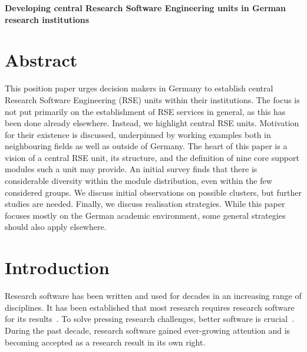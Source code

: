 \documentclass[10pt,letterpaper]{article}
\begin{document}
\vspace*{0.2in}

\begin{flushleft}
{\Large
\textbf{Developing central Research Software Engineering units in German research institutions} %
}
\newline
\\


\end{flushleft}

\section*{Abstract}
This position paper urges decision makers in Germany to establish central Research Software Engineering (RSE) units within their institutions.
The focus is not put primarily on the establishment of RSE services in general, as this has been done already elsewhere.
Instead, we highlight central RSE units.
Motivation for their existence is discussed, underpinned by working examples both in neighbouring fields as well as outside of Germany.
The heart of this paper is a vision of a central RSE unit, its structure, and the definition of nine core support modules such a unit may provide.
An initial survey finds that there is considerable diversity within the module distribution, even within the few considered groups.
We discuss initial observations on possible clusters, but further studies are needed.
Finally, we discuss realisation strategies.
While this paper focuses mostly on the German academic environment, some general strategies should also apply elsewhere.

\linenumbers

\section*{Introduction}
Research software has been written and used for decades in an increasing range of disciplines.
It has been established that most research requires research software for its results~\cite{Hannay2009, Hettrick2015}.
To solve pressing research challenges, better software is crucial~\cite{Goble2014}.
During the past decade, research software gained ever-growing attention and is becoming accepted as a research result in its own right.
\end{document}
